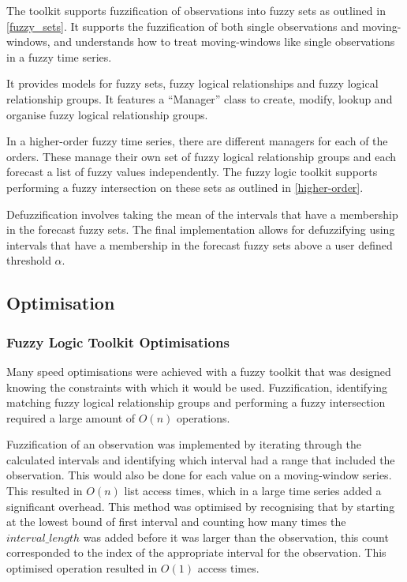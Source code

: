 \documentclass[12pt, oneside, a4paper]{article}
\theoremstyle{definition}
\begin{document}
The toolkit supports fuzzification of observations into fuzzy sets as outlined in \cref{fuzzy_sets}. It supports the fuzzification of both single observations and moving-windows, and understands how to treat moving-windows like single observations in a fuzzy time series.

It provides models for fuzzy sets, fuzzy logical relationships and fuzzy logical relationship groups. It features a ``Manager'' class to create, modify, lookup and organise fuzzy logical relationship groups.

In a higher-order fuzzy time series, there are different managers for each of the orders. These manage their own set of fuzzy logical relationship groups and each forecast a list of fuzzy values independently. The fuzzy logic toolkit supports performing a fuzzy intersection on these sets as outlined in \cref{higher-order}.

Defuzzification involves taking the mean of the intervals that have a membership in the forecast fuzzy sets. The final implementation allows for defuzzifying using intervals that have a membership in the forecast fuzzy sets above a user defined threshold $\alpha$. 

\subsection{Optimisation}

\label{optimisations}

\subsubsection{Fuzzy Logic Toolkit Optimisations}

Many speed optimisations were achieved with a fuzzy toolkit that was designed knowing the constraints with which it would be used. Fuzzification, identifying matching fuzzy logical relationship groups and performing a fuzzy intersection required a large amount of $O(n)$ operations. 

Fuzzification of an observation was implemented by iterating through the calculated intervals and identifying which interval had a range that included the observation. This would also be done for each value on a moving-window series. This resulted in $O(n)$ list access times, which in a large time series added a significant overhead. This method was optimised by recognising that by starting at the lowest bound of first interval and counting how many times the $interval\_length$ was added before it was larger than the observation, this count corresponded to the index of the appropriate interval for the observation. This optimised operation resulted in $O(1)$ access times.
\end{document}
